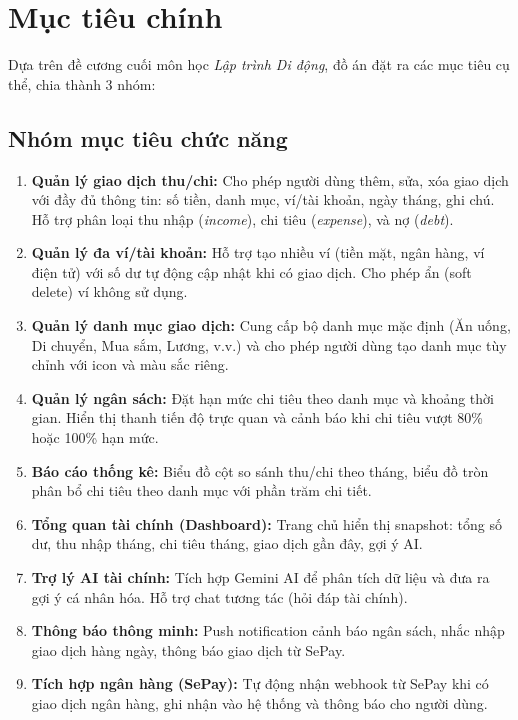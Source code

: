 
\section{Mục tiêu chính}

Dựa trên đề cương cuối môn học \textit{Lập trình Di động}, đồ án đặt ra các mục tiêu cụ thể, chia thành 3 nhóm:

\subsection{Nhóm mục tiêu chức năng}

\begin{enumerate}
  \item \textbf{Quản lý giao dịch thu/chi:} Cho phép người dùng thêm, sửa, xóa giao dịch với đầy đủ thông tin: số tiền, danh mục, ví/tài khoản, ngày tháng, ghi chú. Hỗ trợ phân loại thu nhập (\textit{income}), chi tiêu (\textit{expense}), và nợ (\textit{debt}).
  \item \textbf{Quản lý đa ví/tài khoản:} Hỗ trợ tạo nhiều ví (tiền mặt, ngân hàng, ví điện tử) với số dư tự động cập nhật khi có giao dịch. Cho phép ẩn (soft delete) ví không sử dụng.
  \item \textbf{Quản lý danh mục giao dịch:} Cung cấp bộ danh mục mặc định (Ăn uống, Di chuyển, Mua sắm, Lương, v.v.) và cho phép người dùng tạo danh mục tùy chỉnh với icon và màu sắc riêng.
  \item \textbf{Quản lý ngân sách:} Đặt hạn mức chi tiêu theo danh mục và khoảng thời gian. Hiển thị thanh tiến độ trực quan và cảnh báo khi chi tiêu vượt 80\% hoặc 100\% hạn mức.
  \item \textbf{Báo cáo thống kê:} Biểu đồ cột so sánh thu/chi theo tháng, biểu đồ tròn phân bổ chi tiêu theo danh mục với phần trăm chi tiết.
  \item \textbf{Tổng quan tài chính (Dashboard):} Trang chủ hiển thị snapshot: tổng số dư, thu nhập tháng, chi tiêu tháng, giao dịch gần đây, gợi ý AI.
  \item \textbf{Trợ lý AI tài chính:} Tích hợp Gemini AI để phân tích dữ liệu và đưa ra gợi ý cá nhân hóa. Hỗ trợ chat tương tác (hỏi đáp tài chính).
  \item \textbf{Thông báo thông minh:} Push notification cảnh báo ngân sách, nhắc nhập giao dịch hàng ngày, thông báo giao dịch từ SePay.
  \item \textbf{Tích hợp ngân hàng (SePay):} Tự động nhận webhook từ SePay khi có giao dịch ngân hàng, ghi nhận vào hệ thống và thông báo cho người dùng.
\end{enumerate}

